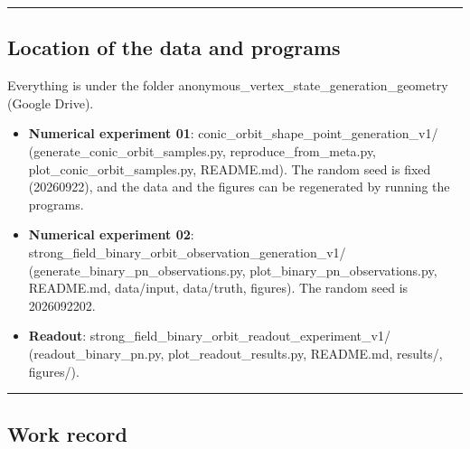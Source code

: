 \documentclass[
  a4paper,
]{article}
\providecommand{\tightlist}{%
  \setlength{\itemsep}{0pt}\setlength{\parskip}{0pt}}
\begin{document}
\begin{center}\rule{0.5\linewidth}{0.5pt}\end{center}

\subsection{Location of the data and
programs}\label{location-of-the-data-and-programs}

Everything is under the folder
anonymous\_vertex\_state\_generation\_geometry (Google Drive).

\begin{itemize}
\tightlist
\item
  \textbf{Numerical experiment 01}:
  conic\_orbit\_shape\_point\_generation\_v1/
  (generate\_conic\_orbit\_samples.py, reproduce\_from\_meta.py,
  plot\_conic\_orbit\_samples.py, README.md). The random seed is fixed
  (20260922), and the data and the figures can be regenerated by running
  the programs.
\item
  \textbf{Numerical experiment 02}:
  strong\_field\_binary\_orbit\_observation\_generation\_v1/
  (generate\_binary\_pn\_observations.py,
  plot\_binary\_pn\_observations.py, README.md, data/input, data/truth,
  figures). The random seed is 2026092202.
\item
  \textbf{Readout}:
  strong\_field\_binary\_orbit\_readout\_experiment\_v1/
  (readout\_binary\_pn.py, plot\_readout\_results.py, README.md,
  results/, figures/).
\end{itemize}

\begin{center}\rule{0.5\linewidth}{0.5pt}\end{center}

\subsection{Work record}\label{work-record}
\end{document}
